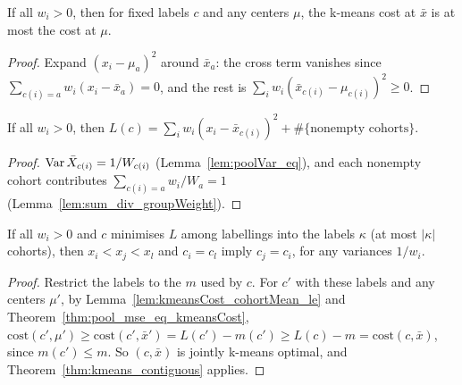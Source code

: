 \begin{lemma}\label{lem:kmeansCost_cohortMean_le}
  \leanok
  If all $w_i > 0$, then for fixed labels $c$ and any centers $\mu$, the
  k-means cost at $\bar x$ is at most the cost at $\mu$.
\end{lemma}
\begin{proof}
  \leanok
  Expand $(x_i - \mu_a)^2$ around $\bar x_a$: the cross term vanishes since
  $\sum_{c(i)=a} w_i (x_i - \bar x_a) = 0$, and the rest is
  $\sum_i w_i (\bar x_{c(i)} - \mu_{c(i)})^2 \ge 0$.
\end{proof}

\begin{theorem}\label{thm:pool_mse_eq_kmeansCost}
  \leanok
  If all $w_i > 0$, then
  $L(c) = \sum_i w_i (x_i - \bar x_{c(i)})^2 + \#\{\text{nonempty cohorts}\}$.
\end{theorem}
\begin{proof}
  \leanok
  $\operatorname{Var} \bar X_{c(i)} = 1/W_{c(i)}$ (Lemma~\ref{lem:poolVar_eq}), and each
  nonempty cohort contributes $\sum_{c(i)=a} w_i / W_a = 1$
  (Lemma~\ref{lem:sum_div_groupWeight}).
\end{proof}

\begin{corollary}\label{cor:pool_optimal_contiguous}
  \leanok
  If all $w_i > 0$ and $c$ minimises $L$ among labellings into the labels
  $\kappa$ (at most $|\kappa|$ cohorts), then $x_i < x_j < x_l$ and
  $c_i = c_l$ imply $c_j = c_i$, for any variances $1/w_i$.
\end{corollary}
\begin{proof}
  \leanok
  Restrict the labels to the $m$ used by $c$. For $c'$ with these labels and
  any centers $\mu'$, by Lemma~\ref{lem:kmeansCost_cohortMean_le} and
  Theorem~\ref{thm:pool_mse_eq_kmeansCost},
  $\mathrm{cost}(c',\mu') \ge \mathrm{cost}(c',\bar x') = L(c') - m(c')
  \ge L(c) - m = \mathrm{cost}(c, \bar x)$, since $m(c') \le m$. So
  $(c, \bar x)$ is jointly k-means optimal, and
  Theorem~\ref{thm:kmeans_contiguous} applies.
\end{proof}

